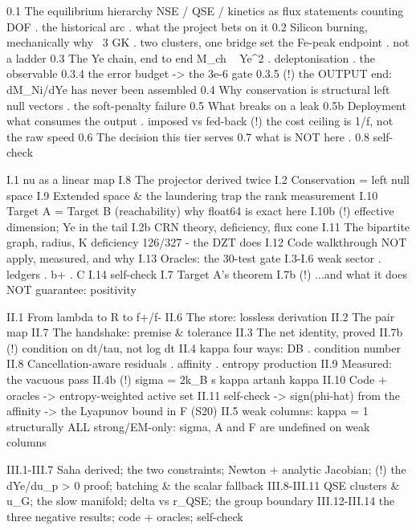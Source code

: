 \begin{srclistingtiny}
0.1  The equilibrium hierarchy          NSE / QSE / kinetics as flux statements
     counting DOF . the historical arc . what the project bets on it
0.2  Silicon burning, mechanically      why ~3 GK . two clusters, one bridge set
                                        the Fe-peak endpoint . not a ladder
0.3  The Ye chain, end to end           M_ch ~ Ye^2 . deleptonisation . the observable
     0.3.4 the error budget -> the 3e-6 gate
     0.3.5 (!) the OUTPUT end: dM_Ni/dYe has never been assembled
0.4  Why conservation is structural      left null vectors . the soft-penalty failure
0.5  What breaks on a leak
0.5b Deployment                          what consumes the output . imposed vs fed-back
                                         (!) the cost ceiling is 1/f, not the raw speed
0.6  The decision this tier serves        0.7 what is NOT here . 0.8 self-check

I.1  nu as a linear map                  I.8  The projector derived twice
I.2  Conservation = left null space      I.9  Extended space & the laundering trap
     the rank measurement                I.10 Target A = Target B (reachability)
     why float64 is exact here           I.10b (!) effective dimension; Ye in the tail
I.2b CRN theory, deficiency, flux cone   I.11 The bipartite graph, radius, K
     deficiency 126/327 - the DZT does   I.12 Code walkthrough
     NOT apply, measured, and why        I.13 Oracles: the 30-test gate
I.3-I.6 weak sector . ledgers . b+ . C   I.14 self-check
I.7  Target A's theorem
I.7b (!) ...and what it does NOT guarantee: positivity

II.1 From lambda to R to f+/f-           II.6  The store: lossless derivation
II.2 The pair map                        II.7  The handshake: premise & tolerance
II.3 The net identity, proved            II.7b (!) condition on dt/tau, not log dt
II.4 kappa four ways: DB . condition number  II.8  Cancellation-aware residuals
     . affinity . entropy production        II.9  Measured: the vacuous pass
II.4b (!) sigma = 2k_B s kappa artanh kappa II.10 Code + oracles
      -> entropy-weighted active set        II.11 self-check
      -> sign(phi-hat) from the affinity
      -> the Lyapunov bound in F (S20)      II.5 weak columns: kappa = 1 structurally
      ALL strong/EM-only: sigma, A and F
      are undefined on weak columns

III.1-III.7  Saha derived; the two constraints; Newton + analytic Jacobian;
             (!) the dYe/du_p > 0 proof; batching & the scalar fallback
III.8-III.11 QSE clusters & u_G; the slow manifold; delta vs r_QSE; the group boundary
III.12-III.14 the three negative results; code + oracles; self-check


\end{srclistingtiny}
